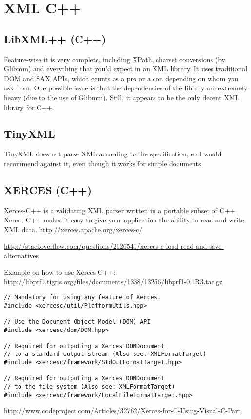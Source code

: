 \chapter{XML C++}


\section{LibXML++ (C++)}
\label{sec:LibXML++}

Feature-wise it is very complete, including XPath, charset conversions (by
Glibmm) and everything that you'd expect in an XML library. It uses traditional
DOM and SAX APIs, which counts as a pro or a con depending on whom you ask from.
One possible issue is that the dependencies of the library are extremely heavy
(due to the use of Glibmm). Still, it appears to be the only decent XML library
for C++.

\section{TinyXML}
\label{sec:TinyXML}

TinyXML does not parse XML according to the specification, so I would recommend against it, even though it works for simple documents.


\section{XERCES (C++)}
\label{sec:XERCES}

	
Xerces-C++ is a validating XML parser written in a portable subset of C++.
Xerces-C++ makes it easy to give your application the ability to read and write
XML data.
\url{http://xerces.apache.org/xerces-c/}

\url{http://stackoverflow.com/questions/2126541/xerces-c-load-read-and-save-alternatives}

Example on how to use Xerces-C++:
\url{http://libprf1.tigris.org/files/documents/1338/13256/libprf1-0.1R3.tar.gz}

\begin{lstlisting}
// Mandatory for using any feature of Xerces.
#include <xercesc/util/PlatformUtils.hpp>

// Use the Document Object Model (DOM) API
#include <xercesc/dom/DOM.hpp>

// Required for outputing a Xerces DOMDocument
// to a standard output stream (Also see: XMLFormatTarget)
#include <xercesc/framework/StdOutFormatTarget.hpp>

// Required for outputing a Xerces DOMDocument
// to the file system (Also see: XMLFormatTarget)
#include <xercesc/framework/LocalFileFormatTarget.hpp>
\end{lstlisting}

\url{http://www.codeproject.com/Articles/32762/Xerces-for-C-Using-Visual-C-Part}